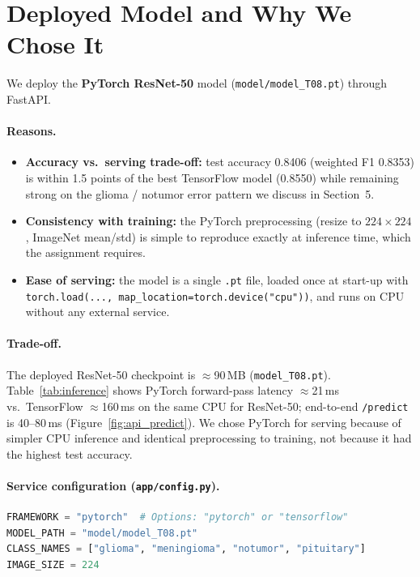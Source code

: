 \documentclass[11pt,a4paper]{article}
\newcommand{\TeamID}{T08}
\begin{document}
\section{Deployed Model and Why We Chose It}
We deploy the \textbf{PyTorch ResNet-50} model (\texttt{model/model\_\TeamID.pt}) through FastAPI.

\paragraph{Reasons.}
\begin{itemize}
  \item \textbf{Accuracy vs.\ serving trade-off:} test accuracy 0.8406 (weighted F1 0.8353) is within 1.5 points of the best TensorFlow model (0.8550) while remaining strong on the glioma / notumor error pattern we discuss in Section~5.
  \item \textbf{Consistency with training:} the PyTorch preprocessing (resize to $224\times224$, ImageNet mean/std) is simple to reproduce exactly at inference time, which the assignment requires.
  \item \textbf{Ease of serving:} the model is a single \texttt{.pt} file, loaded once at start-up with \texttt{torch.load(..., map\_location=torch.device("cpu"))}, and runs on CPU without any external service.
\end{itemize}

\paragraph{Trade-off.}
The deployed ResNet-50 checkpoint is $\approx$90\,MB (\texttt{model\_T08.pt}). Table~\ref{tab:inference} shows PyTorch forward-pass latency $\approx$21\,ms vs.\ TensorFlow $\approx$160\,ms on the same CPU for ResNet-50; end-to-end \texttt{/predict} is 40--80\,ms (Figure~\ref{fig:api_predict}). We chose PyTorch for serving because of simpler CPU inference and identical preprocessing to training, not because it had the highest test accuracy.

\paragraph{Service configuration (\texttt{app/config.py}).}
\begin{lstlisting}[language=Python]
FRAMEWORK = "pytorch"  # Options: "pytorch" or "tensorflow"
MODEL_PATH = "model/model_T08.pt"
CLASS_NAMES = ["glioma", "meningioma", "notumor", "pituitary"]
IMAGE_SIZE = 224
\end{lstlisting}
\end{document}
